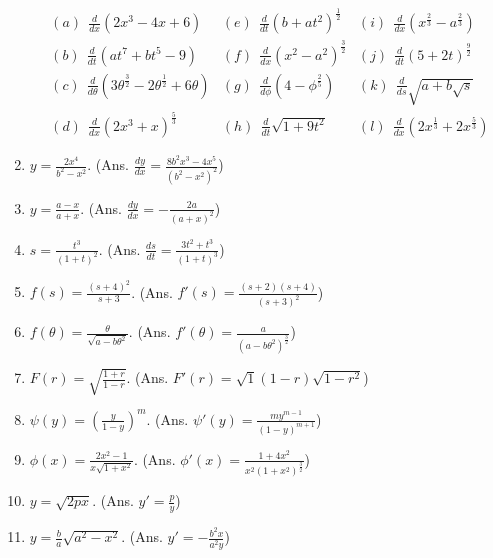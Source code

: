 \begin{enumerate}
\[
\begin{array}{lll}
(a)\ \  \frac{d}{dx}(2x^3 - 4x + 6) & 	(e)\ \  \frac{d}{dt}(b + at^2)^{\frac{1}{2}} & (i)\ \  \frac{d}{dx}(x^{\frac{2}{3}} - a^{\frac{2}{3}})\\
(b)\ \  \frac{d}{dt}(at^7 + bt^5 - 9) &	(f)\ \  \frac{d}{dx}(x^2 - a^2)^{\frac{3}{2}} & 	(j)\ \  \frac{d}{dt}(5 + 2t)^{\frac{9}{2}}\\
(c)\ \  \frac{d}{d\theta}(3\theta^{\frac{3}{2}} - 2\theta^{\frac{1}{2}} + 6\theta) & (g)\ \  \frac{d}{d\phi}(4 - \phi^{\frac{2}{5}}) & (k)\ \  \frac{d}{ds}\sqrt{a + b\sqrt{s}}\\
(d)\ \  \frac{d}{dx}(2x^3 + x)^{\frac{5}{3}} &  	(h)\ \  \frac{d}{dt}\sqrt{1 + 9t^2} & (l)\ \  \frac{d}{dx}(2x^{\frac{1}{3}} + 2x^{\frac{5}{3}})
\end{array}
\]

\item
$y = \frac{2x^4}{b^2 - x^2}$. 	
\qquad (Ans. $\frac{dy}{dx} = \frac{8b^2x^3 - 4x^5}{(b^2 - x^2)^2}$)

\item
$y = \frac{a - x}{a + x}$.
\qquad (Ans. $\frac{dy}{dx} = -\frac{2a}{(a + x)^2}$)

\item
$s = \frac{t^3}{(1 + t)^2}$. 	
\qquad (Ans. $\frac{ds}{dt} = \frac{3t^2 + t^3}{(1 + t)^3}$)

\item
$f(s) = \frac{(s + 4)^2}{s + 3}$. 
\qquad (Ans. $	f'(s) = \frac{(s + 2)(s + 4)}{(s + 3)^2}$)

\item
$f(\theta) = \frac{\theta}{\sqrt{a - b\theta^2}}$. 	
\qquad (Ans. $f'(\theta) = \frac{a}{(a - b\theta^2)^{\frac{3}{2}}}$)

\item
$F(r) = \sqrt{\frac{1 + r}{1 - r}}$.     
\qquad (Ans.	$F'(r) = \sqrt{1}{(1 - r)\sqrt{1 - r^2}}$)

\item
$\psi(y) = \left ( \frac{y}{1 - y} \right )^m$. 
\qquad (Ans. $\psi'(y) = \frac{my^{m - 1}}{(1 - y)^{m + 1}}$)


\item
$\phi(x) = \frac{2x^2 - 1}{x\sqrt{1 + x^2}}$. 	
  \qquad (Ans. $\phi'(x) = \frac{1 + 4x^2}{x^2(1 + x^2)^{\frac{3}{2}}}$)

\item
$y = \sqrt{2px}$.  \qquad (Ans.	$y' = \frac{p}{y}$)

\item
$y = \frac{b}{a}\sqrt{a^2 - x^2}$. 	
 \qquad (Ans.	$y' = -\frac{b^2x}{a^2y}$)


\end{enumerate}

